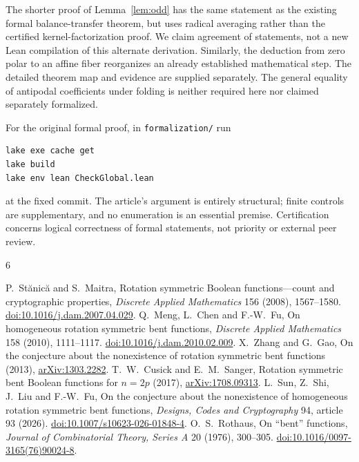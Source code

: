 \documentclass[11pt,a4paper]{article}
\begin{document}
The shorter proof of Lemma~\ref{lem:odd} has the same statement as the existing formal balance-transfer theorem, but uses radical averaging rather than the certified kernel-factorization proof. We claim agreement of statements, not a new Lean compilation of this alternate derivation. Similarly, the deduction from zero polar to an affine fiber reorganizes an already established mathematical step. The detailed theorem map and evidence are supplied separately. The general equality of antipodal coefficients under folding is neither required here nor claimed separately formalized.

For the original formal proof, in \texttt{formalization/} run
\begin{verbatim}
lake exe cache get
lake build
lake env lean CheckGlobal.lean
\end{verbatim}
at the fixed commit. The article's argument is entirely structural; finite controls are supplementary, and no enumeration is an essential premise. Certification concerns logical correctness of formal statements, not priority or external peer review.

\begin{thebibliography}{6}
\raggedright
{} P.~St\u{a}nic\u{a} and S.~Maitra, Rotation symmetric Boolean functions---count and cryptographic properties, \emph{Discrete Applied Mathematics} 156 (2008), 1567--1580. \href{https://doi.org/10.1016/j.dam.2007.04.029}{doi:10.1016/j.dam.2007.04.029}.
 Q.~Meng, L.~Chen and F.-W.~Fu, On homogeneous rotation symmetric bent functions, \emph{Discrete Applied Mathematics} 158 (2010), 1111--1117. \href{https://doi.org/10.1016/j.dam.2010.02.009}{doi:10.1016/j.dam.2010.02.009}.
 X.~Zhang and G.~Gao, On the conjecture about the nonexistence of rotation symmetric bent functions (2013), \href{https://arxiv.org/abs/1303.2282}{arXiv:1303.2282}.
 T.~W.~Cusick and E.~M.~Sanger, Rotation symmetric bent Boolean functions for $n=2p$ (2017), \href{https://arxiv.org/abs/1708.09313}{arXiv:1708.09313}.
 L.~Sun, Z.~Shi, J.~Liu and F.-W.~Fu, On the conjecture about the nonexistence of homogeneous rotation symmetric bent functions, \emph{Designs, Codes and Cryptography} 94, article 93 (2026). \href{https://doi.org/10.1007/s10623-026-01848-4}{doi:10.1007/s10623-026-01848-4}.
 O.~S.~Rothaus, On ``bent'' functions, \emph{Journal of Combinatorial Theory, Series A} 20 (1976), 300--305. \href{https://doi.org/10.1016/0097-3165(76)90024-8}{doi:10.1016/0097-3165(76)90024-8}.
\end{thebibliography}
\end{document}
